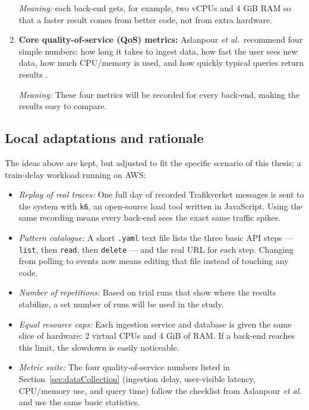 \documentclass[nomenclature, english, biblatex]{kththesis}
\numberwithin{listing}{chapter}
\begin{document}
\begin{enumerate}[label=\textbf{C\arabic*}, leftmargin=*]
        \emph{Meaning:} each back-end gets, for example, two vCPUs and 4 GiB RAM so that a faster result comes from better code, not from extra hardware.

  \item \textbf{Core quality-of-service (QoS) metrics:} 
        Aslanpour \textit{et al.}\ recommend four simple numbers: how long it takes to ingest data, how fast the user sees new data, how much CPU/memory is used, and how quickly typical queries return results \cite{PerformanceEvaluationMetrics}.
        
        \emph{Meaning:} These four metrics will be recorded for every back-end, making the results easy to compare.
\end{enumerate}

\subsection{Local adaptations and rationale} 
The ideas above are kept, but adjusted to fit the specific scenario of this thesis; a train-delay workload running on \gls{AWS}:

\begin{itemize}[leftmargin=*]

  \item \emph{Replay of real traces:} 
        One full day of recorded Trafikverket messages is sent to the system with \texttt{k6}, an open-source load tool written in JavaScript. 
        Using the same recording means every back-end sees the exact same traffic spikes.

  \item \emph{Pattern catalogue:} 
        A short \texttt{.yaml} text file lists the three basic API steps — \texttt{list}, then \texttt{read}, then \texttt{delete} — and the real URL for each step. 
        Changing from polling to events now means editing that file instead of touching any code.

  \item \emph{Number of repetitions:} 
        Based on trial runs that show where the results stabilize, a set number of runs will be used in the study.

  \item \emph{Equal resource caps:} 
        Each ingestion service and database is given the same slice of hardware: 2 virtual CPUs and 4 GiB of RAM. 
        If a back-end reaches this limit, the slowdown is easily noticeable.

  \item \emph{Metric suite:} 
        The four quality-of-service numbers listed in Section~\ref{sec:dataCollection} (ingestion delay, user-visible latency, CPU/memory use, and query time) follow the checklist from Aslanpour \textit{et al.} and use the same basic statistics.
\end{itemize}
\end{document}
